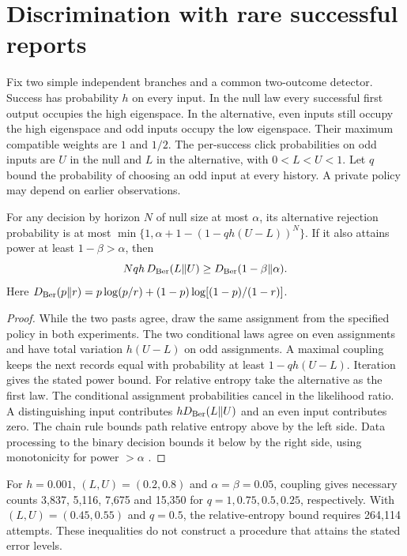 \documentclass[11pt,letterpaper]{article}
\begin{document}
\section{Discrimination with rare successful reports}
Fix two simple independent branches and a common two-outcome detector. Success has probability $h$ on every input. In the null law every successful first output occupies the high eigenspace. In the alternative, even inputs still occupy the high eigenspace and odd inputs occupy the low eigenspace. Their maximum compatible weights are $1$ and $1/2$. The per-success click probabilities on odd inputs are $U$ in the null and $L$ in the alternative, with $0<L<U<1$. Let $q$ bound the probability of choosing an odd input at every history. A private policy may depend on earlier observations.

\begin{proposition}
For any decision by horizon $N$ of null size at most $\alpha$, its alternative rejection probability is at most $\min\{1,\alpha+1-(1-qh(U-L))^N\}$. If it also attains power at least $1-\beta>\alpha$, then
\[
 Nqh\,D_{\rm Ber}(L\|U)\ge D_{\rm Ber}(1-\beta\|\alpha).
\]
Here $D_{\rm Ber}(p\|r)=p\log(p/r)+(1-p)\log[(1-p)/(1-r)]$.
\end{proposition}
\begin{proof}
While the two pasts agree, draw the same assignment from the specified policy in both experiments. The two conditional laws agree on even assignments and have total variation $h(U-L)$ on odd assignments. A maximal coupling keeps the next records equal with probability at least $1-qh(U-L)$. Iteration gives the stated power bound. For relative entropy take the alternative as the first law. The conditional assignment probabilities cancel in the likelihood ratio. A distinguishing input contributes $hD_{\rm Ber}(L\|U)$ and an even input contributes zero. The chain rule bounds path relative entropy above by the left side. Data processing to the binary decision bounds it below by the right side, using monotonicity for power $>\alpha$ \cite{poly}.
\end{proof}
For $h=0.001$, $(L,U)=(0.2,0.8)$ and $\alpha=\beta=0.05$, coupling gives necessary counts 3,837, 5,116, 7,675 and 15,350 for $q=1,0.75,0.5,0.25$, respectively. With $(L,U)=(0.45,0.55)$ and $q=0.5$, the relative-entropy bound requires 264,114 attempts. These inequalities do not construct a procedure that attains the stated error levels.
\end{document}
